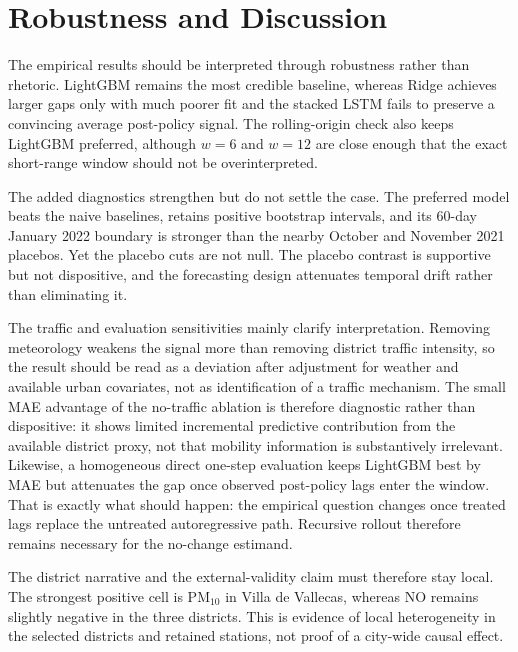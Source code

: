 \section{Robustness and Discussion}\label{sec:discussion}

The empirical results should be interpreted through robustness rather than rhetoric. LightGBM remains the most credible baseline, whereas Ridge achieves larger gaps only with much poorer fit and the stacked LSTM fails to preserve a convincing average post-policy signal. The rolling-origin check also keeps LightGBM preferred, although $w=6$ and $w=12$ are close enough that the exact short-range window should not be overinterpreted.

The added diagnostics strengthen but do not settle the case. The preferred model beats the naive baselines, retains positive bootstrap intervals, and its 60-day January 2022 boundary is stronger than the nearby October and November 2021 placebos. Yet the placebo cuts are not null. The placebo contrast is supportive but not dispositive, and the forecasting design attenuates temporal drift rather than eliminating it.

The traffic and evaluation sensitivities mainly clarify interpretation. Removing meteorology weakens the signal more than removing district traffic intensity, so the result should be read as a deviation after adjustment for weather and available urban covariates, not as identification of a traffic mechanism. The small MAE advantage of the no-traffic ablation is therefore diagnostic rather than dispositive: it shows limited incremental predictive contribution from the available district proxy, not that mobility information is substantively irrelevant. Likewise, a homogeneous direct one-step evaluation keeps LightGBM best by MAE but attenuates the gap once observed post-policy lags enter the window. That is exactly what should happen: the empirical question changes once treated lags replace the untreated autoregressive path. Recursive rollout therefore remains necessary for the no-change estimand.

The district narrative and the external-validity claim must therefore stay local. The strongest positive cell is PM$_{10}$ in Villa de Vallecas, whereas NO remains slightly negative in the three districts. This is evidence of local heterogeneity in the selected districts and retained stations, not proof of a city-wide causal effect.
